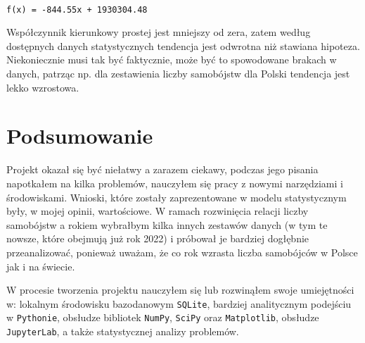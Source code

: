 \documentclass[11pt]{article}
\begin{document}
    \begin{center}
    \end{center}
    { \hspace*{\fill} \\}
    
    \begin{Verbatim}[commandchars=\\\{\}]
f(x) = -844.55x + 1930304.48
    \end{Verbatim}

    Współczynnik kierunkowy prostej jest mniejszy od zera, zatem według
dostępnych danych statystycznych tendencja jest odwrotna niż stawiana
hipoteza. Niekoniecznie musi tak być faktycznie, może być to spowodowane
brakach w danych, patrząc np. dla zestawienia liczby samobójstw dla
Polski tendencja jest lekko wzrostowa.

    \hypertarget{podsumowanie}{%
\section{Podsumowanie}\label{podsumowanie}}

Projekt okazał się być niełatwy a zarazem ciekawy, podczas jego pisania
napotkałem na kilka problemów, nauczyłem się pracy z nowymi narzędziami
i środowiskami. Wnioski, które zostały zaprezentowane w modelu
statystycznym były, w mojej opinii, wartościowe. W ramach rozwinięcia
relacji liczby samobójstw a rokiem wybrałbym kilka innych zestawów
danych (w tym te nowsze, które obejmują już rok 2022) i próbował je
bardziej dogłębnie przeanalizować, ponieważ uważam, że co rok wzrasta
liczba samobójców w Polsce jak i na świecie.

W procesie tworzenia projektu nauczyłem się lub rozwinąłem swoje
umiejętności w: lokalnym środowisku bazodanowym \texttt{SQLite},
bardziej analitycznym podejściu w \texttt{Pythonie}, obsłudze bibliotek
\texttt{NumPy}, \texttt{SciPy} oraz \texttt{Matplotlib}, obsłudze
\texttt{JupyterLab}, a także statystycznej analizy problemów.


    
    
    
\end{document}
